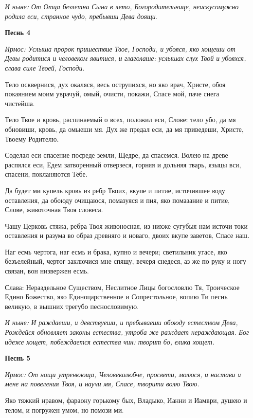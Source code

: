 \itshape И ныне\normalfont{}: От Отца безлетна Сына в лето, Богородительнице, неискусомужно родила еси, странное чудо, пребывши Дева доящи. 

\medskip\bfseries Песнь 4\normalfont{}

\itshape Ирмос\normalfont{}: Услыша пророк пришествие Твое, Господи, и убояся, яко хощеши от Девы родитися и человеком явитися, и глаголаше: услышах слух Твой и убояхся, слава силе Твоей, Господи. 

Тело осквернися, дух окаляся, весь острупихся, но яко врач, Христе, обоя покаянием моим уврачуй, омый, очисти, покажи, Спасе мой, паче снега чистейша. 

Тело Твое и кровь, распинаемый о всех, положил еси, Слове: тело убо, да мя обновиши, кровь, да омыеши мя. Дух же предал еси, да мя приведеши, Христе, Твоему Родителю. 

Соделал еси спасение посреде земли, Щедре, да спасемся. Волею на древе распялся еси, Едем затворенный отверзеся, горняя и дольняя тварь, языцы вси, спасени, покланяются Тебе. 

Да будет ми купель кровь из ребр Твоих, вкупе и питие, источившее воду оставления, да обоюду очищаюся, помазуяся и пия, яко помазание и питие, Слове, животочная Твоя словеса. 

Чашу Церковь стяжа, ребра Твоя живоносная, из нихже сугубыя нам источи токи оставления и разума во образ древняго и новаго, двоих вкупе заветов, Спасе наш. 

Наг есмь чертога, наг есмь и брака, купно и вечери; светильник угасе, яко безъелейный, чертог заключися мне спящу, вечеря снедеся, аз же по руку и ногу связан, вон низвержен есмь. 

Слава: Нераздельное Существом, Неслитное Лицы богословлю Тя, Троическое Едино Божество, яко Единоцарственное и Сопрестольное, вопию Ти песнь великую, в вышних трегубо песнословимую. 

\itshape И ныне\normalfont{}: И раждаеши, и девствуеши, и пребываеши обоюду естеством Дева, Рождейся обновляет законы естества, утроба же раждает нераждающая. Бог идеже хощет, побеждается естества чин: творит бо, елика хощет. 

\medskip\bfseries Песнь 5\normalfont{}

\itshape Ирмос\normalfont{}: От нощи утренююща, Человеколюбче, просвети, молюся, и настави и мене на повеления Твоя, и научи мя, Спасе, творити волю Твою. 

Яко тяжкий нравом, фараону горькому бых, Владыко, Ианни и Иамври, душею и телом, и погружен умом, но помози ми. 

